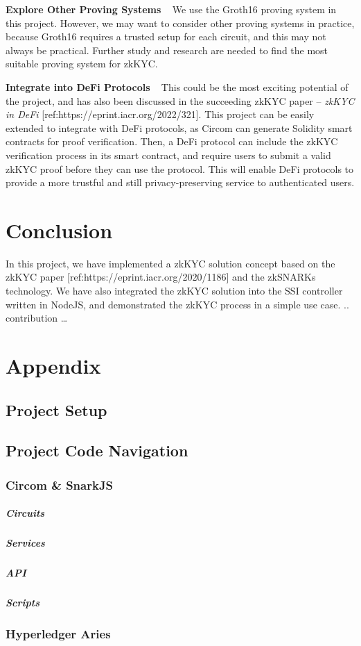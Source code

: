 \documentclass[
]{report}
\begin{document}
\textbf{Explore Other Proving Systems} ~ We use the Groth16 proving
system in this project. However, we may want to consider other proving
systems in practice, because Groth16 requires a trusted setup for each
circuit, and this may not always be practical. Further study and
research are needed to find the most suitable proving system for zkKYC.

\textbf{Integrate into DeFi Protocols} ~ This could be the most exciting
potential of the project, and has also been discussed in the succeeding
zkKYC paper -- \emph{zkKYC in DeFi}
{[}ref:https://eprint.iacr.org/2022/321{]}. This project
can be easily extended to integrate with DeFi protocols, as Circom can
generate Solidity smart contracts for proof verification. Then, a DeFi
protocol can include the zkKYC verification process in its smart
contract, and require users to submit a valid zkKYC proof before they
can use the protocol. This will enable DeFi protocols to provide a more
trustful and still privacy-preserving service to authenticated users.

\chapter{Conclusion}

In this project, we have implemented a zkKYC solution concept based on
the zkKYC paper
{[}ref:https://eprint.iacr.org/2020/1186{]} and the
zkSNARKs technology. We have also integrated the zkKYC solution into the
SSI controller written in NodeJS, and demonstrated the zkKYC process in
a simple use case. .. contribution \ldots{}

\chapter{Appendix}

\section{Project Setup}

\section{Project Code Navigation}

\subsection{Circom \& SnarkJS}

\paragraph{Circuits}

\paragraph{Services}

\paragraph{API}

\paragraph{Scripts}

\subsection{Hyperledger Aries}
\end{document}
